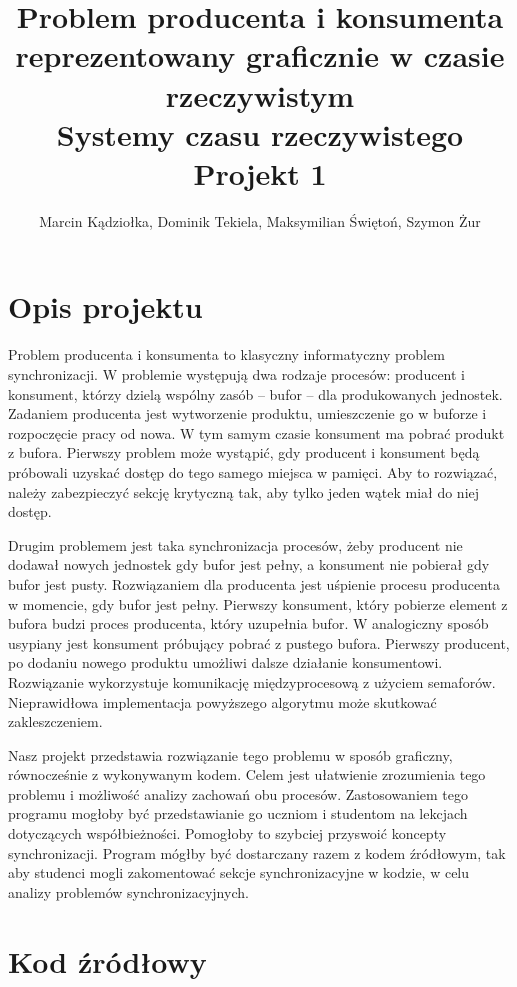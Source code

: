 \documentclass{article}
\author{Marcin Kądziołka, Dominik Tekiela, Maksymilian Świętoń, Szymon Żur}
\title{%
  Problem producenta i konsumenta reprezentowany graficznie w czasie rzeczywistym \\
  \large Systemy czasu rzeczywistego \\
    Projekt 1}
\begin{document}
\maketitle

\section{Opis projektu}

\qquad Problem producenta i konsumenta to klasyczny informatyczny problem synchronizacji. W problemie występują dwa rodzaje procesów: producent i konsument, którzy dzielą wspólny zasób – bufor – dla produkowanych jednostek. Zadaniem producenta jest wytworzenie produktu, umieszczenie go w buforze i rozpoczęcie pracy od nowa. W tym samym czasie konsument ma pobrać produkt z bufora. Pierwszy problem może wystąpić, gdy producent i konsument będą próbowali uzyskać dostęp do tego samego miejsca w pamięci. Aby to rozwiązać, należy zabezpieczyć sekcję krytyczną tak, aby tylko jeden wątek miał do niej dostęp.

Drugim problemem jest taka synchronizacja procesów, żeby producent nie dodawał nowych jednostek gdy bufor jest pełny, a konsument nie pobierał gdy bufor jest pusty. 
Rozwiązaniem dla producenta jest uśpienie procesu producenta w momencie, gdy bufor jest pełny. Pierwszy konsument, który pobierze element z bufora budzi proces producenta, który uzupełnia bufor. W analogiczny sposób usypiany jest konsument próbujący pobrać z pustego bufora. Pierwszy producent, po dodaniu nowego produktu umożliwi dalsze działanie konsumentowi. Rozwiązanie wykorzystuje komunikację międzyprocesową z użyciem semaforów. Nieprawidłowa implementacja powyższego algorytmu może skutkować zakleszczeniem.

Nasz projekt przedstawia rozwiązanie tego problemu w sposób graficzny, równocześnie z wykonywanym kodem. Celem jest ułatwienie zrozumienia tego problemu i możliwość analizy zachowań obu procesów.
Zastosowaniem tego programu mogłoby być przedstawianie go uczniom i studentom na lekcjach dotyczących współbieżności. Pomogłoby to szybciej przyswoić koncepty synchronizacji. Program mógłby być dostarczany razem z kodem źródłowym, tak aby studenci mogli zakomentować sekcje synchronizacyjne w kodzie, w celu analizy problemów synchronizacyjnych. 


\section{Kod źródłowy}
\end{document}
